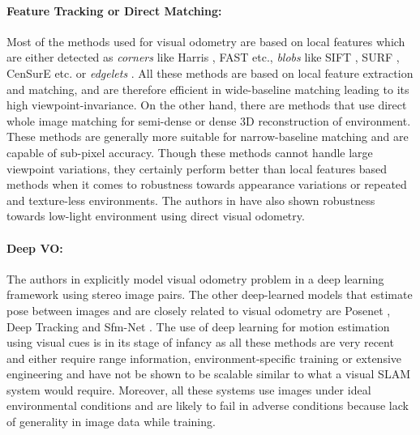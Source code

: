 \documentclass{article}
\begin{document}
\paragraph{Feature Tracking or Direct Matching:} Most of the methods used for visual odometry are based on local features which are either detected as \emph{corners} like Harris \cite{Harris1988}, FAST \cite{EdwardRosten} etc., \emph{blobs} like SIFT \cite{Lowe2004}, SURF \cite{Bay2008}, CenSurE \cite{Forsyth2008} etc. or \emph{edgelets} \cite{klein2008improving}. All these methods are based on local feature extraction and matching, and are therefore efficient in wide-baseline matching leading to its high viewpoint-invariance. On the other hand, there are methods that use direct whole image matching for semi-dense \cite{Forster2014,Engel2013} or dense \cite{Newcombe2011,Tykkala2011} 3D reconstruction of environment. These methods are generally more suitable for narrow-baseline matching and are capable of sub-pixel accuracy. Though these methods cannot handle large viewpoint variations, they certainly perform better than local features based methods when it comes to robustness towards appearance variations or repeated and texture-less environments. The authors in \cite{alismail2016direct} have also shown robustness towards low-light environment using direct visual odometry.

\paragraph{Deep VO:}
The authors in \cite{konda2015learning} explicitly model visual odometry problem in a deep learning framework using stereo image pairs. The other deep-learned models that estimate pose between images and are closely related to visual odometry are Posenet \cite{kendall2015posenet}, Deep Tracking \cite{dequaire2016deep} and Sfm-Net \cite{vijayanarasimhan2017sfm}. The use of deep learning for motion estimation using visual cues is in its stage of infancy as all these methods are very recent and either require range information, environment-specific training or extensive engineering and have not be shown to be scalable similar to what a visual SLAM system would require. Moreover, all these systems use images under ideal environmental conditions and are likely to fail in adverse conditions because lack of generality in image data while training.
\end{document}
